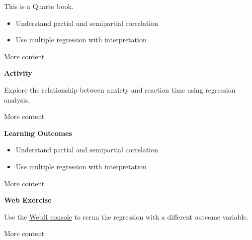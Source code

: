 \documentclass[
  letterpaper,
  DIV=11,
  numbers=noendperiod]{scrreprt}
\providecommand{\tightlist}{%
  \setlength{\itemsep}{0pt}\setlength{\parskip}{0pt}}\usepackage{longtable,booktabs,array}
\begin{document}

This is a Quarto book.





\begin{gslearningoutcome}

\begin{itemize}
\tightlist
\item
  Understand partial and semipartial correlation
\item
  Use multiple regression with interpretation
\end{itemize}

\end{gslearningoutcome}

More content

\begin{gsactivity}

\textbf{Activity}

Explore the relationship between anxiety and reaction time using
regression analysis.

\end{gsactivity}

More content

\begin{gslearningoutcome}

\textbf{Learning Outcomes}

\begin{itemize}
\tightlist
\item
  Understand partial and semipartial correlation\\
\item
  Use multiple regression with interpretation
\end{itemize}

\end{gslearningoutcome}

More content

\begin{gswebexercise}

\textbf{Web Exercise}

Use the \href{https://webr.r-wasm.org/}{WebR console} to rerun the
regression with a different outcome variable.

\end{gswebexercise}

More content
\end{document}
